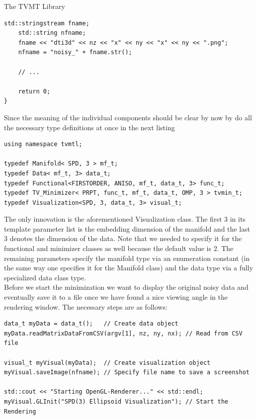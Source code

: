 \begin{chapter}{The TVMT Library}
\begin{lstlisting}[label=code:tut3_init,caption={Initialization}]
    std::stringstream fname;
    std::string nfname;
    fname << "dti3d" << nz << "x" << ny << "x" << ny << ".png";
    nfname = "noisy_" + fname.str();
    
    // ...

    return 0;    
}
\end{lstlisting}
	
Since the meaning of the individual components should be clear by now by do all the necessary type definitions at once in the next listing\\
\cppinline
\begin{lstlisting}[label=code:tut3_typdefinitions,caption={Type definitions, Visualization type}]
using namespace tvmtl;

typedef Manifold< SPD, 3 > mf_t;
typedef Data< mf_t, 3> data_t;
typedef Functional<FIRSTORDER, ANISO, mf_t, data_t, 3> func_t;
typedef TV_Minimizer< PRPT, func_t, mf_t, data_t, OMP, 3 > tvmin_t;
typedef Visualization<SPD, 3, data_t, 3> visual_t;
\end{lstlisting}

The only innovation is the aforementioned Visualization class. The first $3$ in its template parameter list is the embedding dimension of the manifold 
and the last $3$ denotes the dimension of the data. Note that we needed to specify it for the functional and minimizer classes as well because the default value is $2$. 
The remaining parameters specify the manifold type via an enumeration constant (in the same way one specifies it for the Manifold class) and the data type via a fully
specialized data class type.\\
Before we start the minimization we want to display the original noisy data and eventually save it to a file once we have found a nice viewing angle in the rendering window.
The necessary steps are as follows:\\

\cppinline
\begin{lstlisting}[label=code:tut3_rendernoisyimg,caption={Data input and displaying the noisy data}]
data_t myData = data_t();   // Create data object
myData.readMatrixDataFromCSV(argv[1], nz, ny, nx); // Read from CSV file

visual_t myVisual(myData);  // Create visualization object
myVisual.saveImage(nfname); // Specify file name to save a screenshot

std::cout << "Starting OpenGL-Renderer..." << std::endl;
myVisual.GLInit("SPD(3) Ellipsoid Visualization"); // Start the Rendering
\end{lstlisting}


\end{chapter}
